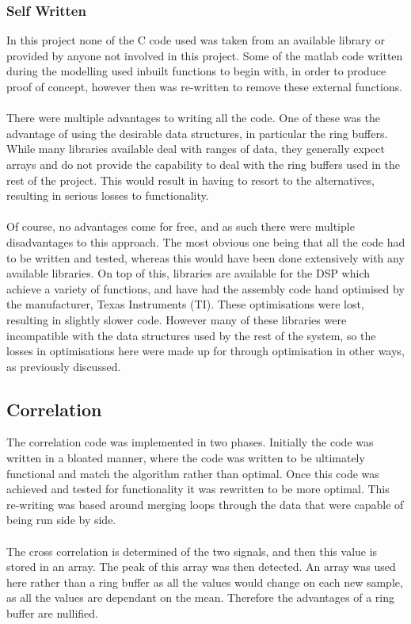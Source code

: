 \subsubsection{Self Written}
In this project none of the C code used was taken from an available library or provided by anyone not involved in this project.
Some of the matlab code written during the modelling used inbuilt functions to begin with, in order to produce proof of concept, however then was re-written to remove these external functions.
\\
\\
There were multiple advantages to writing all the code.
One of these was the advantage of using the desirable data structures, in particular the ring buffers.
While many libraries available deal with ranges of data, they generally expect arrays and do not provide the capability to deal with the ring buffers used in the rest of the project.
This would result in having to resort to the alternatives, resulting in serious losses to functionality.
\\
\\
Of course, no advantages come for free, and as such there were multiple disadvantages to this approach.
The most obvious one being that all the code had to be written and tested, whereas this would have been done extensively with any available libraries.
On top of this, libraries are available for the DSP which achieve a variety of functions, and have had the assembly code hand optimised by the manufacturer, Texas Instruments (TI).
These optimisations were lost, resulting in slightly slower code.
However many of these libraries were incompatible with the data structures used by the rest of the system, so the losses in optimisations here were made up for through optimisation in other ways, as previously discussed.

\subsection{Correlation}
The correlation code was implemented in two phases.
Initially the code was written in a bloated manner, where the code was written to be ultimately functional and match the algorithm rather than optimal.
Once this code was achieved and tested for functionality it was rewritten to be more optimal.
This re-writing was based around merging loops through the data that were capable of being run side by side.
\\
\\
The cross correlation is determined of the two signals, and then this value is stored in an array.
The peak of this array was then detected.
An array was used here rather than a ring buffer as all the values would change on each new sample, as all the values are dependant on the mean.
Therefore the advantages of a ring buffer are nullified.

